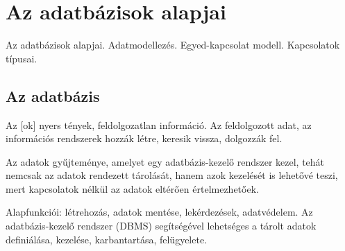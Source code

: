 \documentclass[../../main.tex]{subfiles}
\begin{document}
\section{Az adatbázisok alapjai}

\begin{fulltheorem}
	Az adatbázisok alapjai. Adatmodellezés. Egyed-kapcsolat modell. Kapcsolatok típusai.
\end{fulltheorem}

\subsection{Az adatbázis}

Az [ok] nyers tények, feldolgozatlan információ. Az
 feldolgozott adat, az információs rendszerek hozzák létre,
keresik vissza, dolgozzák fel.

Az  adatok gyűjteménye, amelyet egy adatbázis-kezelő rendszer
kezel, tehát nemcsak az adatok rendezett tárolását, hanem azok kezelését is
lehetővé teszi, mert kapcsolatok nélkül az adatok eltérően értelmezhetőek.

Alapfunkciói: létrehozás, adatok mentése, lekérdezések, adatvédelem.
Az adatbázis-kezelő rendszer (DBMS) segítségével lehetséges a tárolt
adatok definiálása, kezelése, karbantartása, felügyelete.
\end{document}
